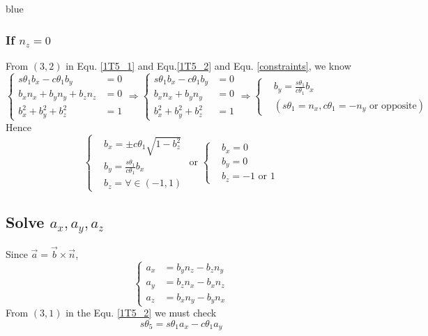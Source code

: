\documentclass[utf8]{article}
\begin{document}
\begin{color}{blue}
\subsubsection{If $n_z = 0$}
From $(3, 2)$ in Equ. \ref{1T5_1} and Equ.\ref{1T5_2} and Equ. \ref{constraints}, we know
$$\left\{
\begin{aligned}
s\theta_1b_x - c\theta_1b_y &= 0\\
b_xn_x + b_yn_y + b_zn_z &= 0\\
b_x^2 + b_y^2 + b_z^2 &= 1
\end{aligned}
\right.
\Rightarrow 
\left\{
\begin{aligned}
s\theta_1b_x - c\theta_1b_y &= 0\\
b_xn_x + b_yn_y &= 0\\
b_x^2 + b_y^2 + b_z^2 &= 1
\end{aligned}
\right.
\Rightarrow 
\left\{
\begin{aligned}
&b_y = \frac{s\theta_1}{c\theta_1}b_x\\
&(s\theta_1 = n_x, c\theta_1 = -n_y \mbox{ or opposite})
\end{aligned}
\right.$$
Hence
$$\left\{
\begin{aligned}
&b_x = \pm c\theta_1\sqrt{1-b_z^2}\\
&b_y = \frac{s\theta_1}{c\theta_1}b_x\\
&b_z = \forall \in (-1, 1)
\end{aligned}
\right.
\mbox{ or }
\left\{
\begin{aligned}
&b_x = 0\\
&b_y = 0\\
&b_z = -1 \mbox{ or } 1
\end{aligned}
\right.
$$

\end{color}

\subsection{Solve $a_x, a_y, a_z$}
Since $\vec{a} = \vec{b}\times \vec{n}$, 
\begin{equation}
\left\{
\begin{aligned}
a_x &= b_yn_z - b_zn_y\\
a_y &= b_zn_x - b_xn_z\\
a_z &= b_xn_y - b_yn_x
\end{aligned}
\right.
\end{equation}
From $(3, 1)$ in the Equ. \ref{1T5_2} we must check
$$s\theta_5 = s\theta_1a_x - c\theta_1 a_y$$
\end{document}
